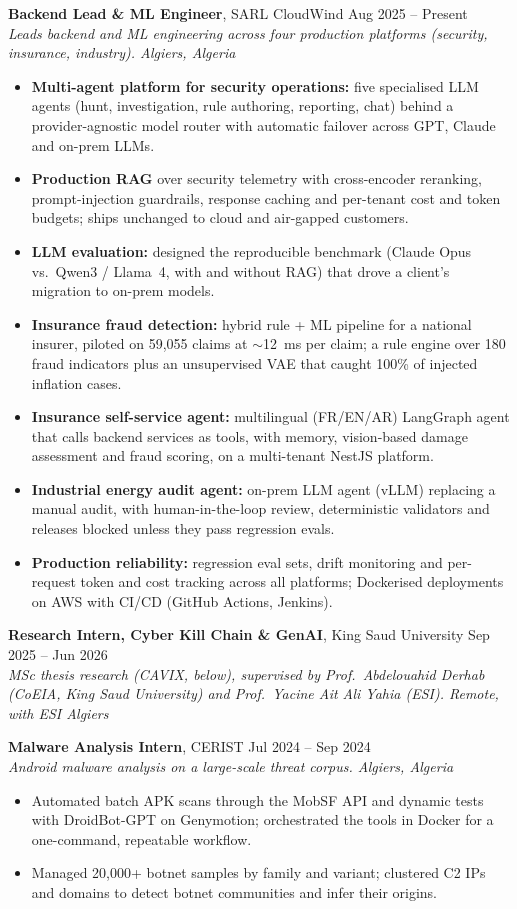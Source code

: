 \documentclass[10pt,a4paper]{article}
\newcommand{\role}[4]{\textbf{#1}, #2 \hfill #3\\ \textit{#4}}
\begin{document}
\role{Backend Lead \& ML Engineer}{SARL CloudWind}{Aug 2025 -- Present}{Leads backend and ML engineering across four production platforms (security, insurance, industry). \hfill Algiers, Algeria}
\begin{itemize}
  \item \textbf{Multi-agent platform for security operations:} five specialised LLM agents (hunt, investigation, rule authoring, reporting, chat) behind a provider-agnostic model router with automatic failover across GPT, Claude and on-prem LLMs.
  \item \textbf{Production RAG} over security telemetry with cross-encoder reranking, prompt-injection guardrails, response caching and per-tenant cost and token budgets; ships unchanged to cloud and air-gapped customers.
  \item \textbf{LLM evaluation:} designed the reproducible benchmark (Claude Opus vs.\ Qwen3 / Llama~4, with and without RAG) that drove a client's migration to on-prem models.
  \item \textbf{Insurance fraud detection:} hybrid rule + ML pipeline for a national insurer, piloted on 59{,}055 claims at ${\sim}$12~ms per claim; a rule engine over 180 fraud indicators plus an unsupervised VAE that caught 100\% of injected inflation cases.
  \item \textbf{Insurance self-service agent:} multilingual (FR/EN/AR) LangGraph agent that calls backend services as tools, with memory, vision-based damage assessment and fraud scoring, on a multi-tenant NestJS platform.
  \item \textbf{Industrial energy audit agent:} on-prem LLM agent (vLLM) replacing a manual audit, with human-in-the-loop review, deterministic validators and releases blocked unless they pass regression evals.
  \item \textbf{Production reliability:} regression eval sets, drift monitoring and per-request token and cost tracking across all platforms; Dockerised deployments on AWS with CI/CD (GitHub Actions, Jenkins).
\end{itemize}

\vspace{3pt}
\role{Research Intern, Cyber Kill Chain \& GenAI}{King Saud University}{Sep 2025 -- Jun 2026}{MSc thesis research (CAVIX, below), supervised by Prof.\ Abdelouahid Derhab (CoEIA, King Saud University) and Prof.\ Yacine Ait Ali Yahia (ESI). \hfill Remote, with ESI Algiers}

\vspace{3pt}
\role{Malware Analysis Intern}{CERIST}{Jul 2024 -- Sep 2024}{Android malware analysis on a large-scale threat corpus. \hfill Algiers, Algeria}
\begin{itemize}
  \item Automated batch APK scans through the MobSF API and dynamic tests with DroidBot-GPT on Genymotion; orchestrated the tools in Docker for a one-command, repeatable workflow.
  \item Managed 20{,}000+ botnet samples by family and variant; clustered C2 IPs and domains to detect botnet communities and infer their origins.
\end{itemize}
\end{document}
